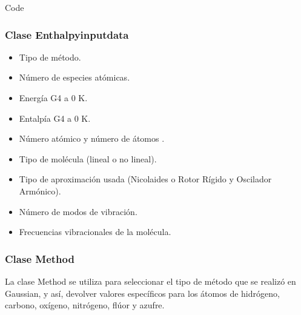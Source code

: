 \documentclass{beamer}
\begin{document}

\begin{frame}[fragile]{Code}
\frametitle{Clase Enthalpyinputdata}

\begin{itemize}
	\item Tipo de método.
	\item Número de especies atómicas.
	\item Energía G4 a 0 K.
	\item Entalpía G4 a 0 K.
	\item Número atómico y número de átomos .
	\item Tipo de molécula (lineal o no lineal).
	\item Tipo de aproximación usada (Nicolaides o Rotor Rígido y Oscilador Armónico).
	\item Número de modos de vibración.
	\item Frecuencias vibracionales de la molécula.
\end{itemize}
\end{frame}

\begin{frame}
\frametitle{Clase Method}
La clase Method se utiliza para seleccionar el tipo de método que se realizó en Gaussian, y así, devolver valores específicos para los átomos de hidrógeno, carbono, oxígeno, nitrógeno, flúor y azufre.
\end{frame}
\end{document}
